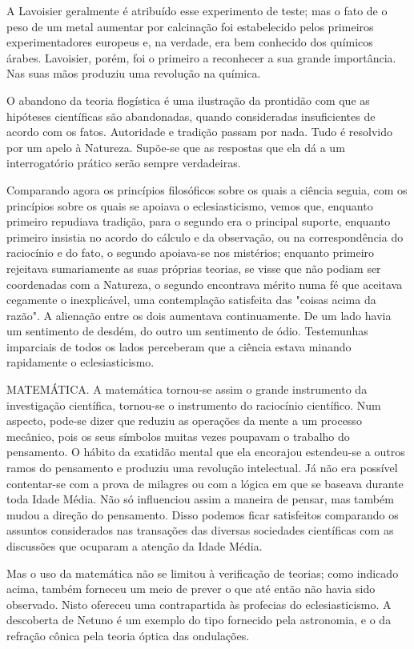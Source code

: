 \documentclass[11pt,a5paper,twoside,openany]{book}
\begin{document}
A Lavoisier geralmente é atribuído esse experimento de teste; mas o fato de o peso de um metal aumentar por calcinação foi estabelecido pelos primeiros experimentadores europeus e, na verdade, era bem conhecido dos químicos árabes. Lavoisier, porém, foi o primeiro a reconhecer a sua grande importância. Nas suas mãos produziu uma revolução na química.

O abandono da teoria flogística é uma ilustração da prontidão com que as hipóteses científicas são abandonadas, quando consideradas insuficientes de acordo com os fatos. Autoridade e tradição passam por nada. Tudo é resolvido por um apelo à Natureza. Supõe-se que as respostas que ela dá a um interrogatório prático serão sempre verdadeiras.

Comparando agora os princípios filosóficos sobre os quais a ciência seguia, com os princípios sobre os quais se apoiava o eclesiasticismo, vemos que, enquanto primeiro repudiava tradição, para o segundo era o principal suporte, enquanto primeiro insistia no acordo do cálculo e da observação, ou na correspondência do raciocínio e do fato, o segundo apoiava-se nos mistérios; enquanto primeiro rejeitava sumariamente as suas próprias teorias, se visse que não podiam ser coordenadas com a Natureza, o segundo encontrava mérito numa fé que aceitava cegamente o inexplicável, uma contemplação satisfeita das "coisas acima da razão". A alienação entre os dois aumentava continuamente. De um lado havia um sentimento de desdém, do outro um sentimento de ódio. Testemunhas imparciais de todos os lados perceberam que a ciência estava minando rapidamente o eclesiasticismo.

MATEMÁTICA. A matemática tornou-se assim o grande instrumento da investigação científica, tornou-se o instrumento do raciocínio científico. Num aspecto, pode-se dizer que reduziu as operações da mente a um processo mecânico, pois os seus símbolos muitas vezes poupavam o trabalho do pensamento. O hábito da exatidão mental que ela encorajou estendeu-se a outros ramos do pensamento e produziu uma revolução intelectual. Já não era possível contentar-se com a prova de milagres ou com a lógica em que se baseava durante toda Idade Média. Não só influenciou assim a maneira de pensar, mas também mudou a direção do pensamento. Disso podemos ficar satisfeitos comparando os assuntos considerados nas transações das diversas sociedades científicas com as discussões que ocuparam a atenção da Idade Média.

Mas o uso da matemática não se limitou à verificação de teorias; como indicado acima, também forneceu um meio de prever o que até então não havia sido observado. Nisto ofereceu uma contrapartida às profecias do eclesiasticismo. A descoberta de Netuno é um exemplo do tipo fornecido pela astronomia, e o da refração cônica pela teoria óptica das ondulações.
\end{document}

